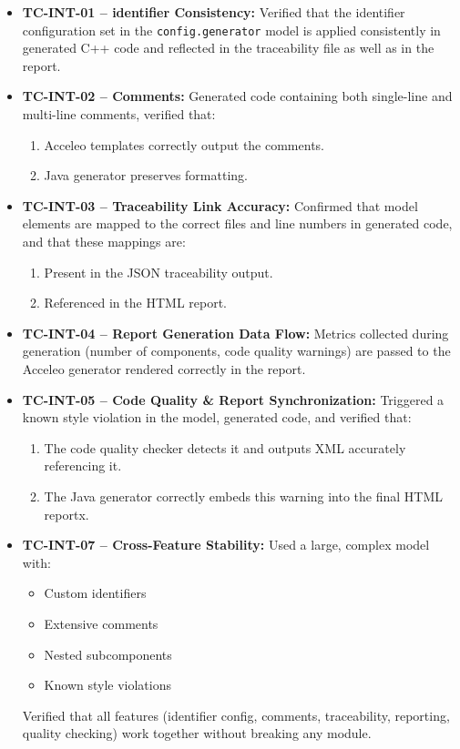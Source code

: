 \begin{itemize}
	\item \textbf{TC-INT-01 – \Gls{identifier} Consistency:} Verified that the \gls{identifier} configuration set in the \texttt{config.generator} model is applied consistently in generated C++ code and reflected in the traceability file as well as in the report.
	
	\item \textbf{TC-INT-02 – Comments:} Generated code containing both single-line and multi-line comments, verified that:
	\begin{enumerate}
		\item Acceleo templates correctly output the comments.
		\item Java generator preserves formatting.
	\end{enumerate}
	
	\item \textbf{TC-INT-03 – Traceability Link Accuracy:} Confirmed that model elements are mapped to the correct files and line numbers in generated code, and that these mappings are:
	\begin{enumerate}
		\item Present in the \gls{JSON} traceability output.
		\item Referenced in the \gls{HTML} report.
	\end{enumerate}
	
	\item \textbf{TC-INT-04 – Report Generation Data Flow:} Metrics collected during generation (number of components, code quality warnings) are passed to the Acceleo generator rendered correctly in the report.
	
	\item \textbf{TC-INT-05 – Code Quality \& Report Synchronization:} Triggered a known style violation in the model, generated code, and verified that:
	\begin{enumerate}
		\item The code quality checker detects it and outputs XML accurately referencing it.
		\item The Java generator correctly embeds this warning into the final HTML reportx.
	\end{enumerate}
	
	\item \textbf{TC-INT-07 – Cross-Feature Stability:} Used a large, complex model with:
	\begin{itemize}
		\item Custom \glspl{identifier}
		\item Extensive comments
		\item Nested subcomponents
		\item Known style violations
	\end{itemize}
	Verified that all features (\gls{identifier} config, comments, traceability, reporting, quality checking) work together without breaking any module.
\end{itemize}


